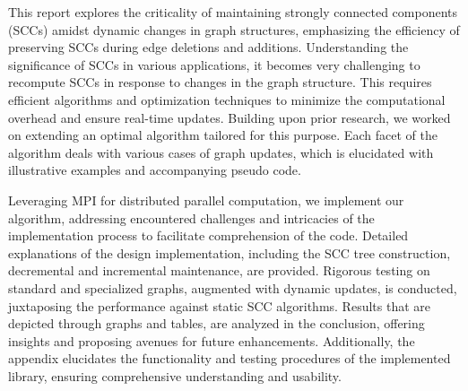 This report explores the criticality of maintaining strongly connected components (SCCs) amidst dynamic changes in graph structures,
 emphasizing the efficiency of preserving SCCs during edge deletions and additions. Understanding the significance of SCCs in various applications,
 it becomes very challenging to recompute SCCs in response to changes in the graph structure. This requires efficient algorithms and optimization techniques
 to minimize the computational overhead and ensure real-time updates.
 Building upon prior research, we worked on extending an optimal algorithm tailored for this purpose. 
 Each facet of the algorithm deals with various cases of graph updates, which is elucidated with illustrative examples and accompanying pseudo code.
 
\vspace {1em}

Leveraging MPI for distributed parallel computation, we implement our algorithm,
 addressing encountered challenges and intricacies of the implementation process to facilitate comprehension of the code. 
 Detailed explanations of the design implementation, including the SCC tree construction, decremental and incremental maintenance, are provided.
 Rigorous testing on standard and specialized graphs, augmented with dynamic updates, is conducted, juxtaposing the performance against static SCC algorithms. 
 Results that are depicted through graphs and tables, are analyzed in the conclusion, offering insights and proposing avenues for future enhancements.
Additionally, the appendix elucidates the functionality and testing procedures of the implemented library, ensuring comprehensive understanding and usability.